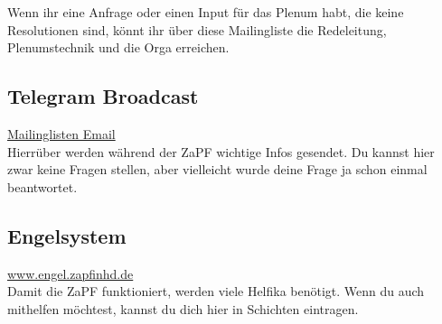 \noindent Wenn ihr eine Anfrage oder einen Input für das Plenum habt, die keine Resolutionen sind, könnt ihr über diese Mailingliste die Redeleitung, Plenumstechnik und die Orga erreichen.

\subsection{Telegram Broadcast}
\url{Mailinglisten Email} \\

\noindent Hierrüber werden während der ZaPF wichtige Infos gesendet. Du kannst hier zwar keine Fragen stellen, aber vielleicht wurde deine Frage ja schon einmal beantwortet.

\subsection{Engelsystem}
\url{www.engel.zapfinhd.de}\\

\noindent Damit die ZaPF funktioniert, werden viele Helfika benötigt. Wenn du auch mithelfen möchtest, kannst du dich hier in Schichten eintragen.